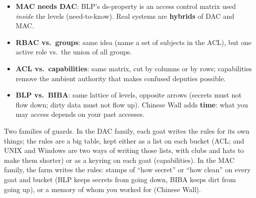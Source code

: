 \begin{keybox}[title=Links across the branches]
\begin{itemize}
  \item \textbf{MAC needs DAC}: BLP's ds-property is an access control matrix used
        \emph{inside} the levels (need-to-know). Real systems are \textbf{hybrids} of DAC and
        MAC.
  \item \textbf{RBAC vs.\ groups}: same idea (name a set of subjects in the ACL), but one active
        role vs.\ the union of all groups.
  \item \textbf{ACL vs.\ capabilities}: same matrix, cut by columns or by rows; capabilities
        remove the ambient authority that makes confused deputies possible.
  \item \textbf{BLP vs.\ BIBA}: same lattice of levels, opposite arrows (secrets must not flow
        down; dirty data must not flow up). Chinese Wall adds \textbf{time}: what you may access
        depends on your past accesses.
\end{itemize}
\end{keybox}

\begin{goatbox}
Two families of guards. In the DAC family, each goat writes the rules for its own things; the
rules are a big table, kept either as a list on each bucket (ACL; and UNIX and Windows are two
ways of writing those lists, with clubs and hats to make them shorter) or as a keyring on each
goat (capabilities). In the MAC family, the farm writes the rules: stamps of ``how secret'' or
``how clean'' on every goat and bucket (BLP keeps secrets from going down, BIBA keeps dirt from
going up), or a memory of whom you worked for (Chinese Wall).
\end{goatbox}

